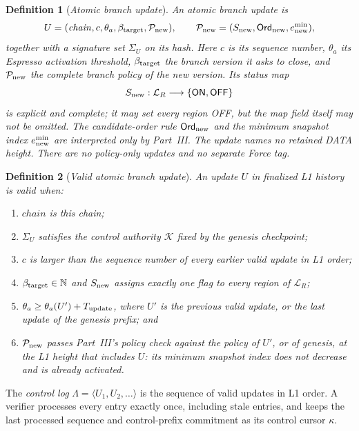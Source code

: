 \documentclass[11pt,a4paper]{article}
\newcommand{\tagg}[1]{\ensuremath{\mathsf{#1}}}
\newcommand{\defterm}[1]{\textcolor{rrBlue}{\textit{#1}}}
\newtheorem{definition}{Definition}[section]
\begin{document}
\begin{definition}[\defterm{Atomic branch update}]
\label{def:control-update}
An atomic branch update is
\[
 U=(\mathit{chain},c,\theta_a,\beta_{\rm target},\mathcal P_{\rm new}),
 \qquad
 \mathcal P_{\rm new}=(S_{\rm new},\mathsf{Ord}_{\rm new},e^{\min}_{\rm new}),
\]
together with a signature set $\Sigma_U$ on its hash. Here $c$ is its
sequence number, $\theta_a$ its Espresso activation threshold,
$\beta_{\rm target}$ the branch version it asks to close, and
$\mathcal P_{\rm new}$ the complete \defterm{branch policy} of the new
version. Its status map
\[
 S_{\rm new}:\mathcal L_R\longrightarrow
 \{\tagg{ON},\tagg{OFF}\}
\]
is explicit and complete; it may set every region OFF, but the map
field itself may not be omitted. The candidate-order rule
$\mathsf{Ord}_{\rm new}$ and the minimum snapshot index
$e^{\min}_{\rm new}$ are interpreted only by Part~III. The update names
no retained DATA height. There are no policy-only updates and no
separate Force tag.
\end{definition}

\begin{definition}[\defterm{Valid atomic branch update}]
\label{def:control-valid}
An update $U$ in finalized L1 history is valid when:
\begin{enumerate}[label=(V\arabic*)]
\item $\mathit{chain}$ is this chain;
\item $\Sigma_U$ satisfies the control authority $\mathcal K$ fixed by
the genesis checkpoint;
\item $c$ is larger than the sequence number of every earlier valid
update in L1 order;
\item $\beta_{\rm target}\in\mathbb N$ and $S_{\rm new}$ assigns exactly
one flag to every region of $\mathcal L_R$;
\item $\theta_a\ge\theta_a(U')+T_{\rm update}$, where $U'$ is the
previous valid update, or the last update of the genesis prefix; and
\item $\mathcal P_{\rm new}$ passes Part~III's policy check against the
policy of $U'$, or of genesis, at the L1 height that includes $U$: its
minimum snapshot index does not decrease and is already activated.
\end{enumerate}
\end{definition}

The \defterm{control log} $\Lambda=\langle U_1,U_2,\ldots\rangle$ is the
sequence of valid updates in L1 order. A verifier processes every entry
exactly once, including stale entries, and keeps the last processed
sequence and control-prefix commitment as its control cursor $\kappa$.
\end{document}
